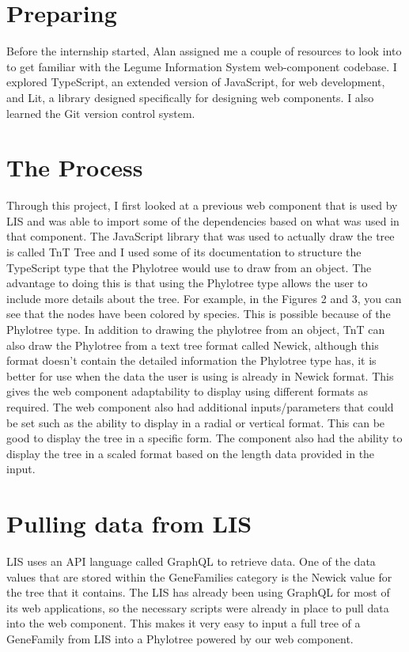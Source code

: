 \documentclass[twoside,twocolumn]{article}
\begin{document}
	\section{Preparing}
	Before the internship started, Alan assigned me a couple of resources to look into to get familiar with the Legume Information System web-component codebase. I explored TypeScript, an extended version of JavaScript, for web development, and Lit, a library designed specifically for designing web components. I also learned the Git version control system.
	\section{The Process}
    Through this project, I first looked at a previous web component that is used by LIS and was able to import some of the dependencies based on what was used in that component. The JavaScript library that was used to actually draw the tree is called TnT Tree and I used some of its documentation to structure the TypeScript type that the Phylotree would use to draw from an object. The advantage to doing this is that using the Phylotree type allows the user to include more details about the tree. For example, in the Figures 2 and 3, you can see that the nodes  have been colored by species. This is possible because of the Phylotree type. In addition to drawing the phylotree from an object, TnT can also draw the Phylotree from a text tree format called Newick, although this format doesn't contain the detailed information the Phylotree type has, it is better for use when the data the user is using is already in Newick format. This gives the web component adaptability to display using different formats as required. The web component also had additional inputs/parameters that could be set such as the ability to display in a radial or vertical format. This can be good to display the tree in a specific form. The component also had the ability to display the tree in a scaled format based on the length data provided in the input. 
    \section{Pulling data from LIS}
    LIS uses an API language called GraphQL to retrieve data. One of the data values that are stored within the GeneFamilies category is the Newick value for the tree that it contains. The LIS has already been using GraphQL for most of its web applications, so the necessary scripts were already in place to pull data into the web component. This makes it very easy to input a full tree of a GeneFamily from LIS into a Phylotree powered by our web component.
   
\end{document}
